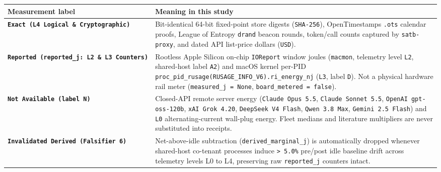 \documentclass[10pt,letterpaper]{article}
\newcounter{none}
\begin{document}
{\def\LTcaptype{none} %
{\footnotesize\setlength{\tabcolsep}{3.8pt}\renewcommand{\arraystretch}{1.15}
\begin{longtable}[]{@{}
  >{\raggedright\arraybackslash}p{}
  >{\raggedright\arraybackslash}p{}@{}}
\toprule\noalign{}
\begin{minipage}[b]{\linewidth}\raggedright
\textbf{Measurement label}
\end{minipage} & \begin{minipage}[b]{\linewidth}\raggedright
\textbf{Meaning in this study}
\end{minipage} \\
\midrule\noalign{}
\endhead
\bottomrule\noalign{}
\endlastfoot
\textbf{\texttt{Exact\ (\allowbreak{}L4\ Logical\ \&\ Cryptographic)}} &
Bit-identical 64-bit fixed-point store digests (\texttt{SHA-256}),
OpenTimestamps \texttt{.ots} calendar proofs, League of Entropy
\texttt{drand} beacon rounds, token/call counts captured by
\texttt{satb-\allowbreak{}proxy}, and dated API list-price dollars (\texttt{USD}). \\
\textbf{\texttt{Reported\ (\allowbreak{}reported\_\allowbreak{}j:\ L2\ \&\ L3\ Counters)}} &
Rootless Apple Silicon on-chip \texttt{IOReport} window joules
(\texttt{macmon}, telemetry level \texttt{L2}, shared-host label
\texttt{A2}) and macOS kernel per-PID
\texttt{proc\_\allowbreak{}pid\_\allowbreak{}rusage(\allowbreak{}RUSAGE\_\allowbreak{}INFO\_\allowbreak{}V6).\allowbreak{}ri\_\allowbreak{}energy\_\allowbreak{}nj}
(\texttt{L3}, label \texttt{D}). Not a physical hardware rail meter
(\texttt{measured\_\allowbreak{}j\ =\ None}, \texttt{board\_\allowbreak{}metered\ =\ false}). \\
\textbf{\texttt{Not\ Available\ (\allowbreak{}label\ N)}} & Closed-API remote server
energy (\texttt{Claude\ Opus\ 5.\allowbreak{}5}, \texttt{Claude\ Sonnet\ 5.\allowbreak{}5},
\texttt{OpenAI\ gpt-\allowbreak{}oss-\allowbreak{}120b}, \texttt{xAI\ Grok\ 4.\allowbreak{}20},
\texttt{DeepSeek\ V4\ Flash}, \texttt{Qwen\ 3.\allowbreak{}8\ Max},
\texttt{Gemini\ 2.\allowbreak{}5\ Flash}) and \texttt{L0} alternating-current
wall-plug energy. Fleet medians and literature multipliers are never
substituted into receipts. \\
\textbf{\texttt{Invalidated\ Derived\ (\allowbreak{}Falsifier\ 6)}} & Net-above-idle
subtraction (\texttt{derived\_\allowbreak{}marginal\_\allowbreak{}j}) is automatically dropped
whenever shared-host co-tenant processes induce
\texttt{\textgreater{}\ 5.0\%} pre/post idle baseline drift across
telemetry levels L0 to L4, preserving raw \texttt{reported\_\allowbreak{}j} counters
intact. \\
\end{longtable}
}
}
\end{document}
